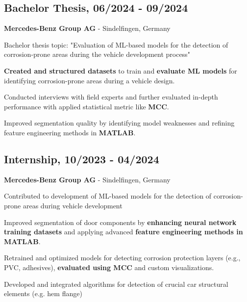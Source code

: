 \subsection*{Bachelor Thesis, 06/2024 - 09/2024}
\textbf{Mercedes-Benz Group AG} - Sindelfingen, Germany
\begin{highlights}
    \item Bachelor thesis topic: "Evaluation of ML-based models for the detection of corrosion-prone areas during the vehicle development process"
    \item \textbf{Created and structured datasets} to train and \textbf{evaluate ML models} for identifying corrosion-prone areas during a vehicle design.
    \item Conducted interviews with field experts and further evaluated in-depth performance with applied statistical metric like \textbf{MCC}.
    \item Improved segmentation quality by identifying model weaknesses and refining feature engineering methods in \textbf{MATLAB}.
\end{highlights}

\subsection*{Internship, 10/2023 - 04/2024}
\textbf{Mercedes-Benz Group AG} - Sindelfingen, Germany
\begin{highlights}
    \item Contributed to development of ML-based models for the detection of corrosion-prone areas during vehicle development
    \item Improved segmentation of door components by \textbf{enhancing neural network training datasets} and applying advanced \textbf{feature engineering methods in MATLAB}.
    \item Retrained and optimized models for detecting corrosion protection layers (e.g., PVC, adhesives), \textbf{evaluated using MCC} and custom visualizations.
    \item Developed and integrated algorithms for detection of crucial car structural elements (e.g. hem flange)
\end{highlights}

